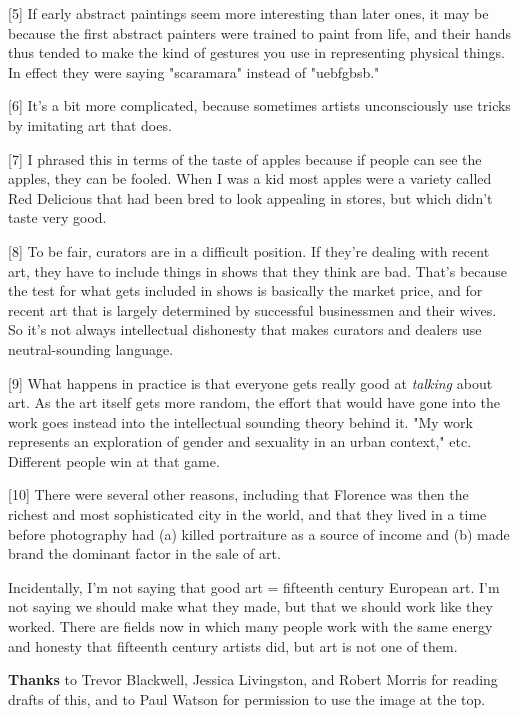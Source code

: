 [5] If early abstract paintings seem more interesting than
                  later ones, it may be because the first abstract painters were
                  trained to paint from life, and their hands thus tended to
                  make the kind of gestures you use in representing physical
                  things. In effect they were saying "scaramara" instead of
                  "uebfgbsb."

[6] It's a bit more complicated, because sometimes artists
                  unconsciously use tricks by imitating art that does.

[7] I phrased this in terms of the taste of apples because if
                  people can see the apples, they can be fooled. When I was a
                  kid most apples were a variety called Red Delicious that had
                  been bred to look appealing in stores, but which didn't taste
                  very good.

[8] To be fair, curators are in a difficult position. If
                  they're dealing with recent art, they have to include things
                  in shows that they think are bad. That's because the test for
                  what gets included in shows is basically the market price, and
                  for recent art that is largely determined by successful
                  businessmen and their wives. So it's not always intellectual
                  dishonesty that makes curators and dealers use
                  neutral-sounding language.

[9] What happens in practice is that everyone gets really good
                  at \emph{talking} about art. As the art itself gets more
                  random, the effort that would have gone into the work goes
                  instead into the intellectual sounding theory behind it. "My
                  work represents an exploration of gender and sexuality in an
                  urban context," etc. Different people win at that game.

[10] There were several other reasons, including that Florence
                  was then the richest and most sophisticated city in the world,
                  and that they lived in a time before photography had (a)
                  killed portraiture as a source of income and (b) made brand
                  the dominant factor in the sale of art.

Incidentally,
                  I'm not saying that good art = fifteenth century European art.
                  I'm not saying we should make what they made, but that we
                  should work like they worked. There are fields now in which
                  many people work with the same energy and honesty that
                  fifteenth century artists did, but art is not one of them.

\textbf{Thanks}
                  to Trevor Blackwell, Jessica Livingston, and Robert Morris for
                  reading drafts of this, and to Paul Watson for permission to
                  use the image at the top.





              
            
          
